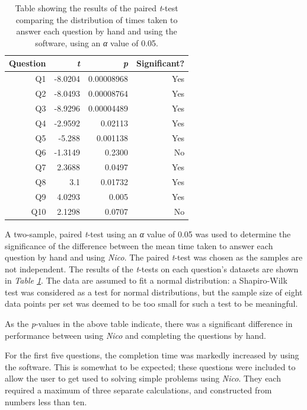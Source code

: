 \documentclass[12pt,twoside,notitlepage,xetex]{report}
\begin{document}
\begin{center}
\begin{table}[H]
\begin{center}
\begin{tabular}{|r|r|r|r|}
\hline
Question & \emph{t} & \emph{p} & Significant?\\ \hline \hline
Q1 & -8.0204 & 0.00008968 & Yes\\ \hline
Q2 & -8.0493 & 0.00008764 & Yes\\ \hline
Q3 & -8.9296 & 0.00004489 & Yes\\ \hline
Q4 & -2.9592 & 0.02113 & Yes\\ \hline
Q5 & -5.288 & 0.001138 & Yes\\ \hline
Q6 & -1.3149 & 0.2300 & No\\ \hline
Q7 & 2.3688 & 0.0497 & Yes\\ \hline
Q8 & 3.1 & 0.01732 & Yes\\ \hline
Q9 & 4.0293 & 0.005 & Yes\\ \hline
Q10 & 2.1298 & 0.0707 & No\\
\hline
\end{tabular}
\end{center}
\caption{Table showing the results of the paired \emph{t}-test comparing the distribution of times taken to answer each question by hand and using the software, using an \emph{α} value of 0.05.}
\label{tab:TTests}
\end{table}
\end{center}

A two-sample, paired \emph{t}-test using an \emph{α} value of 0.05 was used to determine the significance of the difference between the mean time taken to answer each question by hand and using \emph{Nico}.  The paired \emph{t}-test was chosen as the samples are not independent.  The results of the \emph{t}-tests on each question's datasets are shown in \emph{Table \ref{tab:TTests}}.  The data are assumed to fit a normal distribution: a Shapiro-Wilk test was considered as a test for normal distributions, but the sample size of eight data points per set was deemed to be too small for such a test to be meaningful.

As the \emph{p}-values in the above table indicate, there was a significant difference in performance between using \emph{Nico} and completing the questions by hand.

For the first five questions, the completion time was markedly increased by using the software.  This is somewhat to be expected;  these questions were included to allow the user to get used to solving simple problems using \emph{Nico}.  They each required a maximum of three separate calculations, and constructed from numbers less than ten.
\end{document}
